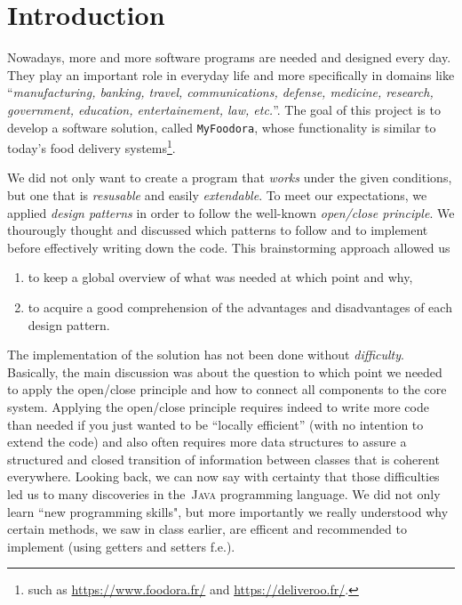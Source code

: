 \section{Introduction} %
\label{sec:introduction}
Nowadays, more and more software programs are needed and designed every day.
They play an important role in everyday life and more specifically
in domains like ``\textit{manufacturing, banking, travel, communications,
defense, medicine, research, government, education, entertainement,
law, etc.}''\cite[p.6]{long2008critical}.
The goal of this project is to develop a software solution,
called \lstinline|MyFoodora|, whose functionality is similar to today's food delivery systems\footnote{such as \url{https://www.foodora.fr/}
and \url{https://deliveroo.fr/}.}.

We did not only want to create a program that \emph{works} under the given conditions,
but one that is \emph{resusable} and easily \emph{extendable}.
To meet our expectations, we applied \emph{design patterns} in order
to follow the well-known \emph{open/close principle}.
We thourougly thought and discussed which patterns to follow
and to implement before effectively writing down the code.
This brainstorming approach allowed us
\begin{enumerate}
  \item to keep a global overview of what was needed at which point and why,
  \item to acquire a good comprehension of the advantages and disadvantages of each
  design pattern.
\end{enumerate}

The implementation of the solution has not been done without \emph{difficulty}.
Basically, the main discussion was about the question to which point we needed to apply the
open/close principle and how to connect all components to the core system.
Applying the open/close principle requires indeed to write more code than 
needed if you just wanted to be ``locally efficient'' (with no 
intention to extend the code) and also often requires more data structures to assure a structured and closed transition of information between classes that is coherent everywhere.
Looking back, we can now say with certainty that those difficulties
led us to many discoveries in the~\textsc{Java} programming language.
We did not only learn ``new programming skills", but more importantly we really 
understood why certain methods, we saw in class earlier, are efficent and recommended to implement (using getters and setters f.e.). 

